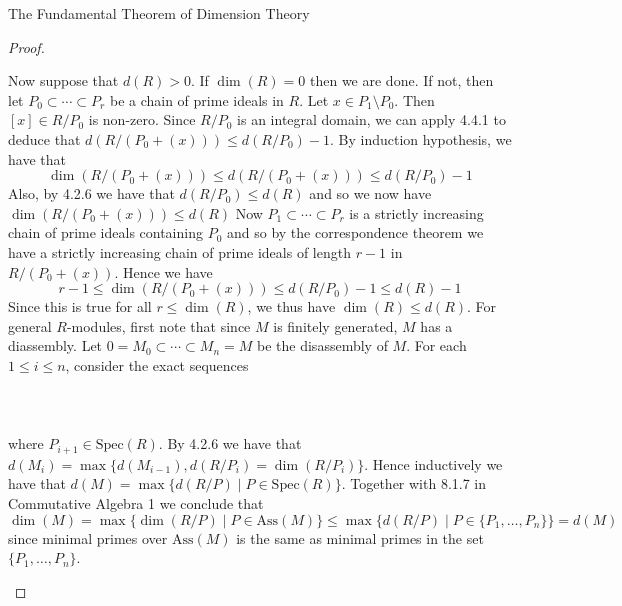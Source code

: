 \documentclass[a4paper]{article}
\begin{document}
\begin{thm}{The Fundamental Theorem of Dimension Theory}{}
\begin{proof}
\begin{itemize}
Now suppose that $d(R)>0$. If $\dim(R)=0$ then we are done. If not, then let $P_0\subset\cdots\subset P_r$ be a chain of prime ideals in $R$. Let $x\in P_1\setminus P_0$. Then $[x]\in R/P_0$ is non-zero. Since $R/P_0$ is an integral domain, we can apply 4.4.1 to deduce that $d(R/(P_0+(x)))\leq d(R/P_0)-1$. By induction hypothesis, we have that $$\dim(R/(P_0+(x)))\leq d(R/(P_0+(x)))\leq d(R/P_0)-1$$ Also, by 4.2.6 we have that $d(R/P_0)\leq d(R)$ and so we now have $\dim(R/(P_0+(x)))\leq d(R)$ Now $P_1\subset\cdots\subset P_r$ is a strictly increasing chain of prime ideals containing $P_0$ and so by the correspondence theorem we have a strictly increasing chain of prime ideals of length $r-1$ in $R/(P_0+(x))$. Hence we have $$r-1\leq\dim(R/(P_0+(x)))\leq d(R/P_0)-1\leq d(R)-1$$ Since this is true for all $r\leq\dim(R)$, we thus have $\dim(R)\leq d(R)$. For general $R$-modules, first note that since $M$ is finitely generated, $M$ has a diassembly. Let $0=M_0\subset\cdots\subset M_n=M$ be the disassembly of $M$. For each $1\leq i\leq n$, consider the exact sequences \\~\\
\\~\\
where $P_{i+1}\in\text{Spec}(R)$. By 4.2.6 we have that $d(M_i)=\max\{d(M_{i-1}),d(R/P_i)=\dim(R/P_i)\}$. Hence inductively we have that $d(M)=\max\{d(R/P)\;|\;P\in\text{Spec}(R)\}$. Together with 8.1.7 in Commutative Algebra 1 we conclude that $$\dim(M)=\max\{\dim(R/P)\;|\;P\in\text{Ass}(M)\}\leq\max\{d(R/P)\;|\;P\in\{P_1,\dots,P_n\}\}=d(M)$$ since minimal primes over $\text{Ass}(M)$ is the same as minimal primes in the set $\{P_1,\dots,P_n\}$. 


\end{itemize}
\end{proof}
\end{thm}
\end{document}
